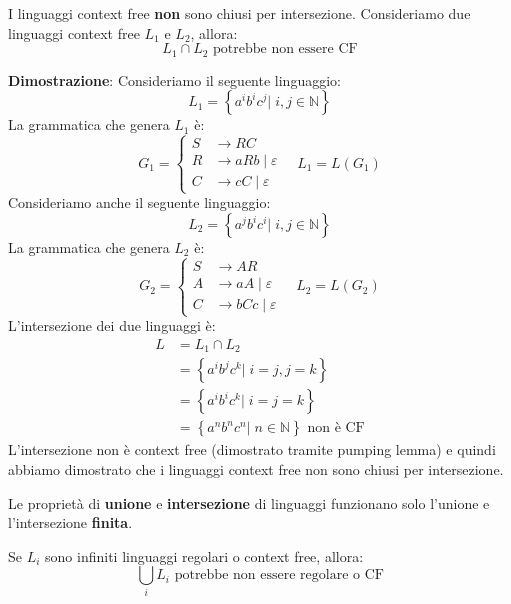 \documentclass[a4paper]{article}
\begin{document}
\begin{theorem}
  I linguaggi context free \textbf{non} sono chiusi per intersezione. Consideriamo
  due linguaggi context free \( L_1 \) e \( L_2 \), allora:
  \[
    L_1 \cap L_2 \text{ potrebbe non essere CF}
  \] 

  \vspace{1em}
  \noindent
  \textbf{Dimostrazione}: Consideriamo il seguente linguaggio:
  \[
    L_1 = \left\{ a^i b^i c^j \left|\; i, j \in \mathbb{N} \right. \right\}
  \] 
  La grammatica che genera \( L_1 \) è:
  \[
    G_1 = 
    \left\{
    \begin{aligned}
      S &\to RC\\
      R &\to aR b \;|\; \varepsilon \\
      C &\to cC \;|\; \varepsilon
    \end{aligned}
    \right.
    \quad L_1 = L(G_1)
  \] 
  Consideriamo anche il seguente linguaggio:
  \[
    L_2 = \left\{ a^j b^i c^i \left|\; i, j \in \mathbb{N} \right. \right\}
  \] 
  La grammatica che genera \( L_2 \) è:
  \[
    G_2 = 
    \left\{
    \begin{aligned}
      S &\to AR\\
      A &\to aA \;|\; \varepsilon \\
      C &\to bC c \;|\; \varepsilon
    \end{aligned}
    \right.
    \quad L_2 = L(G_2)
  \]
  L'intersezione dei due linguaggi è:
  \[
    \begin{aligned}
    L &= L_1 \cap L_2 \\
      &= \left\{ a^i b^j c^k \left|\; i = j, j = k \right. \right\} \\
      &= \left\{ a^i b^i c^k \left|\; i = j = k \right. \right\} \\
      &= \left\{ a^n b^n c^n \left|\; n \in \mathbb{N} \right. \right\} \text{ non è CF}
    \end{aligned}
  \] 
  L'intersezione non è context free (dimostrato tramite pumping lemma) e quindi abbiamo
  dimostrato che i linguaggi context free non sono chiusi per intersezione.
\end{theorem}

\begin{define}
  Le proprietà di \textbf{unione} e \textbf{intersezione} di linguaggi funzionano solo
  l'unione e l'intersezione \textbf{finita}.

  Se \( L_i \) sono infiniti linguaggi regolari o context free, allora:
  \[
    \bigcup_{i} L_i \text{ potrebbe non essere regolare o CF}
  \] 
\end{define}
\end{document}
